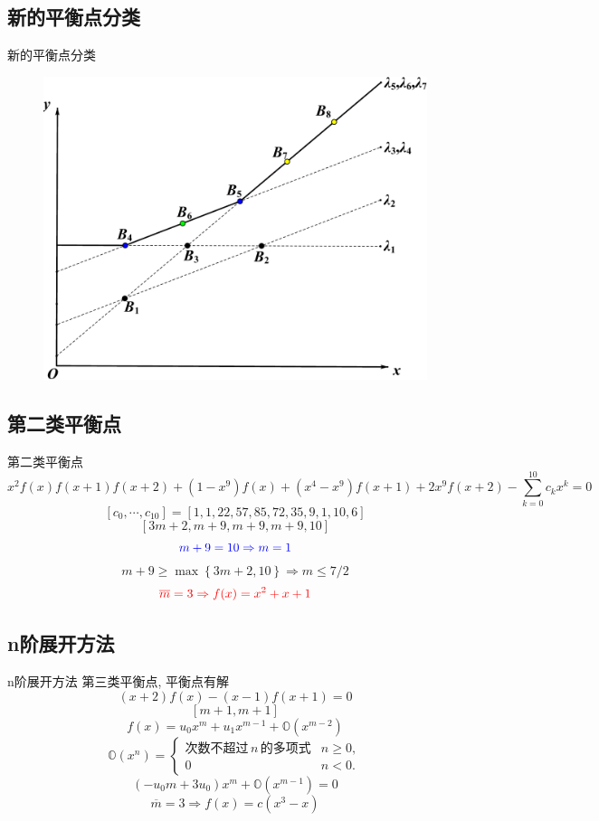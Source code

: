 \documentclass[handout]{beamer}
\newcommand{\sbrace}[1]{\left(#1\right)}
\newcommand{\bbrace}[1]{\left\{#1\right\}}
\newcommand{\OO}{\ensuremath{\mathbb O}}%
\newcommand{\red}[1]{{\color{red}#1}}
\newcommand{\blue}[1]{{\color{blue}#1}}
\begin{document}
\subsection{新的平衡点分类}
\begin{frame}{新的平衡点分类}
\begin{figure}
\centering
\includegraphics[height=0.8\textheight]{../paper/fig/ps.pdf}
\end{figure}
\end{frame}

\subsection{第二类平衡点}
\begin{frame}{第二类平衡点}
\small 
\[
    x^2f(x)f(x+1)f(x+2)+(1-x^9)f(x)+(x^4-x^9)f(x+1)+2x^9f(x+2)-\sum_{k=0}^{10}{c_k x^k}=0
\]
\[
    [c_0,\cdots,c_{10}]=[1,1,22,57,85,72,35,9,1,10,6]
\]
\[
    [3m+2,m+9,m+9,m+9,10]
\]
\[
    \blue{m+9=10 \Rightarrow m=1}
\]
\[
    m+9 \ge \max\bbrace{3m+2,10} \Rightarrow m\le 7/2
\]
\[
    \red{\overline{m}=3 \Rightarrow f(x)=x^2+x+1}
\]
\end{frame}

\subsection{n阶展开方法}
\begin{frame}{n阶展开方法}
第三类平衡点, 平衡点有解 
\[
    (x+2)f(x)-(x-1)f(x+1)=0
\]
\[
    [m+1,m+1]
\]
\pause 
\[
    f(x)=u_0 x^m + u_1 x^{m-1} + \OO(x^{m-2})
\]
\[
    \OO\sbrace{x^n}=\left\{
    \begin{array}{cl}
    \text{次数不超过}\,n\,\text{的多项式} & n\ge 0, \\
    0                                    & n<0 .
    \end{array}
    \right.
\]
\[
    (-u_0 m+3u_0)x^m+\OO(x^{m-1})=0
\]
\[
    \overline{m}=3 \Rightarrow f(x)=c(x^3-x)
\]
\end{frame}
\end{document}

